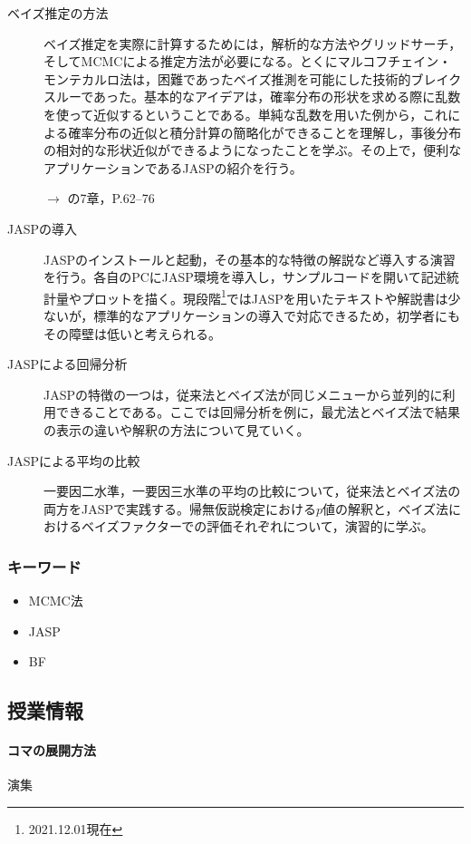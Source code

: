 \begin{description}
	\item[ベイズ推定の方法] ベイズ推定を実際に計算するためには，解析的な方法やグリッドサーチ，そしてMCMCによる推定方法が必要になる。とくにマルコフチェイン・モンテカルロ法は，困難であったベイズ推測を可能にした技術的ブレイクスルーであった。基本的なアイデアは，確率分布の形状を求める際に乱数を使って近似するということである。単純な乱数を用いた例から，これによる確率分布の近似と積分計算の簡略化ができることを理解し，事後分布の相対的な形状近似ができるようになったことを学ぶ。その上で，便利なアプリケーションであるJASPの紹介を行う。
	      \begin{flushright}
		      $\to$ \citet{Maeda2017}の7章，\citet{Baba201907}P.62--76
	      \end{flushright}
	\item[JASPの導入] JASPのインストールと起動，その基本的な特徴の解説など導入する演習を行う。各自のPCにJASP環境を導入し，サンプルコードを開いて記述統計量やプロットを描く。現段階\footnote{2021.12.01現在}ではJASPを用いたテキストや解説書は少ないが，標準的なアプリケーションの導入で対応できるため，初学者にもその障壁は低いと考えられる。
	\item[JASPによる回帰分析] JASPの特徴の一つは，従来法とベイズ法が同じメニューから並列的に利用できることである。ここでは回帰分析を例に，最尤法とベイズ法で結果の表示の違いや解釈の方法について見ていく。
	\item[JASPによる平均の比較] 一要因二水準，一要因三水準の平均の比較について，従来法とベイズ法の両方をJASPで実践する。帰無仮説検定における$p$値の解釈と，ベイズ法におけるベイズファクターでの評価それぞれについて，演習的に学ぶ。

\end{description}
\subsubsection{キーワード}
\begin{itemize}
	\item MCMC法
	\item JASP
	\item BF
\end{itemize}
\subsection{授業情報}
\paragraph{コマの展開方法}
演集
